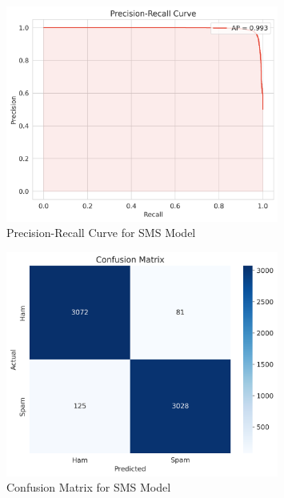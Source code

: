 \documentclass{article}
\begin{document}
\begin{figure}[htbp]
    \centering
    \includegraphics[width=0.8\textwidth]{../analysis/sms/randomforest/precision_recall_curve.png}
    \caption{Precision-Recall Curve for SMS Model}
    \label{fig:precision_recall_curve_2}
\end{figure}

\begin{figure}[htbp]
    \centering
    \includegraphics[width=0.8\textwidth]{../analysis/sms/randomforest/confusion_matrix.png}
    \caption{Confusion Matrix for SMS Model}
    \label{fig:confusion_matrix_2}
\end{figure}

\newpage
\end{document}
